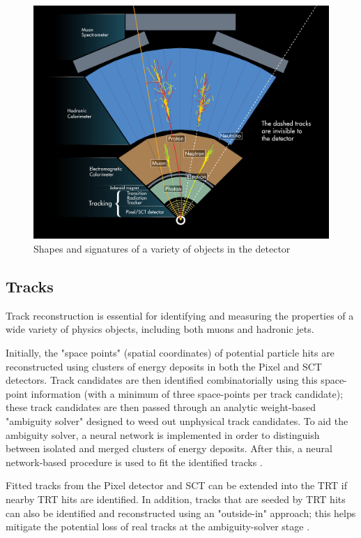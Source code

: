 \begin{figure}
  \includegraphics[width=\linewidth]{figures/methods_chapter/Sigs.jpg}
  \caption{Shapes and signatures of a variety of objects in the detector \cite{CERN-EX-1301009}}
  \label{fig:Signatures}
\end{figure}

\subsection{Tracks} \label{sec:Tracks} 

Track reconstruction is essential for identifying and measuring the properties of a wide variety of physics objects, including both muons and hadronic jets.

Initially, the "space points" (spatial coordinates) of potential particle hits are reconstructed using clusters of energy deposits in both the Pixel and SCT detectors. Track candidates are then identified combinatorially using this space-point information (with a minimum of three space-points per track candidate); these track candidates are then passed through an analytic weight-based "ambiguity solver" designed to weed out unphysical track candidates. To aid the ambiguity solver, a neural network is implemented in order to distinguish between isolated and merged clusters of energy deposits. After this, a neural network-based procedure is used to fit the identified tracks \cite{tracker}.

Fitted tracks from the Pixel detector and SCT can be extended into the TRT if nearby TRT hits are identified. In addition, tracks that are seeded by TRT hits can also be identified and reconstructed using an "outside-in" approach; this helps mitigate the potential loss of real tracks at the ambiguity-solver stage \cite{NEWT}.

